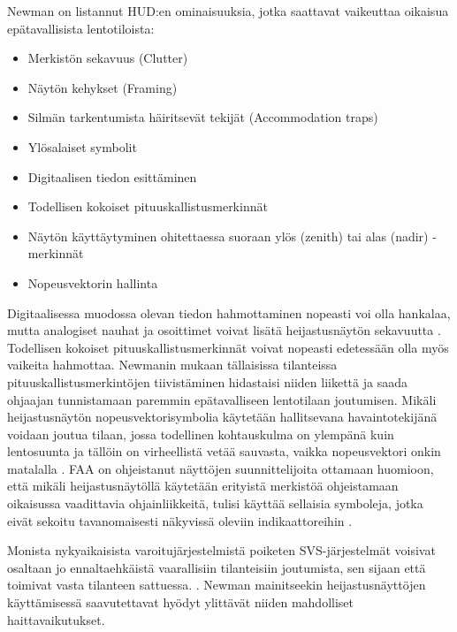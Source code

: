 \documentclass[utf8,bachelor,manualbib]{gradu3}
\begin{document}
Newman \citeyearpar{newman2000} on listannut HUD:en ominaisuuksia, jotka saattavat vaikeuttaa oikaisua epätavallisista lentotiloista:

\begin{itemize}
\item Merkistön sekavuus (Clutter)
\item Näytön kehykset (Framing)
\item Silmän tarkentumista häiritsevät tekijät (Accommodation traps)
\item Ylösalaiset symbolit
\item Digitaalisen tiedon esittäminen
\item Todellisen kokoiset pituuskallistusmerkinnät
\item Näytön käyttäytyminen ohitettaessa suoraan ylös (zenith) tai alas (nadir) -merkinnät
\item Nopeusvektorin hallinta
\end{itemize} 

Digitaalisessa muodossa olevan tiedon hahmottaminen nopeasti voi olla hankalaa, mutta analogiset nauhat ja osoittimet voivat lisätä heijastusnäytön sekavuutta \citeyearpar{zuschlag2003}. Todellisen kokoiset pituuskallistusmerkinnät voivat nopeasti edetessään olla myös vaikeita hahmottaa. Newmanin \citeyearpar{newman1995} mukaan tällaisissa tilanteissa pituuskallistusmerkintöjen tiivistäminen hidastaisi niiden liikettä ja saada ohjaajan tunnistamaan paremmin epätavalliseen lentotilaan joutumisen. Mikäli heijastusnäytön nopeusvektorisymbolia käytetään hallitsevana havaintotekijänä voidaan joutua tilaan, jossa todellinen kohtauskulma on ylempänä kuin lentosuunta ja tällöin on virheellistä vetää sauvasta, vaikka nopeusvektori onkin matalalla \citep{crawfordneal2006}. FAA on ohjeistanut näyttöjen suunnittelijoita ottamaan huomioon, että mikäli heijastusnäytöllä käytetään erityistä merkistöä ohjeistamaan oikaisussa vaadittavia ohjainliikkeitä, tulisi käyttää sellaisia symboleja, jotka eivät sekoitu tavanomaisesti näkyvissä oleviin indikaattoreihin \citep{crawfordneal2006}.

Monista nykyaikaisista varoitujärjestelmistä poiketen SVS-järjestelmät voisivat osaltaan jo ennaltaehkäistä vaarallisiin tilanteisiin joutumista, sen sijaan että toimivat vasta tilanteen sattuessa. \citep{schnellym2004}. Newman \citeyearpar{newman2000} mainitseekin heijastusnäyttöjen käyttämisessä saavutettavat hyödyt ylittävät niiden mahdolliset haittavaikutukset.
\end{document}
